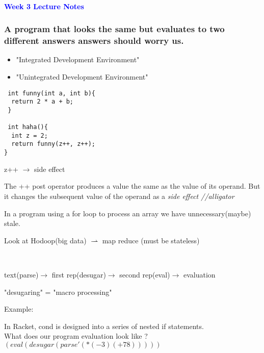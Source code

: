 \documentclass{article}
\begin{document}
\begin{flushleft}
\noindent\makebox[\linewidth]{\rule{\paperwidth}{0.4pt}}\\
\vspace*{1.5cm}
\textcolor{blue}{\textbf{{\huge Week 3 Lecture Notes}}}
\subsubsection*{A program that looks the same but evaluates to two different answers answers should worry us.}
  \begin{itemize}
        \item "Integrated Development Environment"
		\item "Unintegrated Development Environment"
   \end{itemize}


\begin{verbatim} 
 int funny(int a, int b){ 
  return 2 * a + b;
 }
 
 int haha(){
  int z = 2;
  return funny(z++, z++);
}
\end{verbatim}
%

\center z++ $\rightarrow$ side effect\
 
\begin{flushleft}
The ++ post operator produces a value the same as the value of its operand. But it changes the subsequent value of the operand as a \emph{\color{red} side effect //alligator}\\
\end{flushleft}

\begin{flushleft}
In a program using a for loop to process an array we have unnecessary(maybe) stale.
\end{flushleft}

\begin{flushleft}
Look at Hodoop(big data) $\rightharpoonup$ map reduce (must be stateless)
\end{flushleft}\

\center text(parse)$\rightarrow$ first rep(desugar)$\rightarrow$ second rep(eval)$\rightarrow$ evaluation\


\center "desugaring" = "macro processing"\

\begin{flushleft}
Example:
\end{flushleft}

\begin{flushleft}
In Racket, cond is designed into a series of nested if statements.\\
What does our program evaluation look like ?
$(eval(desugar(parse '(* (-3)(+ 7 8)))))$
\end{flushleft}



\end{flushleft}
\end{document}

